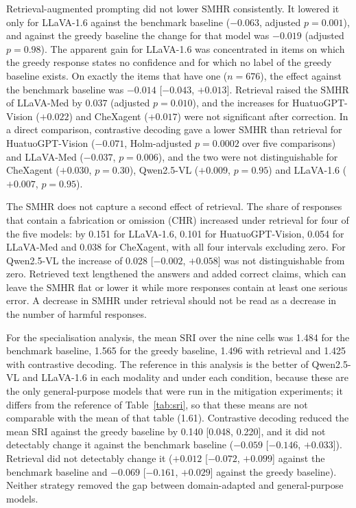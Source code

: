\documentclass[11pt,a4paper]{article}
\newcommand{\SMHR}{\ensuremath{\mathrm{SMHR}}}
\newcommand{\CHR}{\ensuremath{\mathrm{CHR}}}
\newcommand{\SRI}{\ensuremath{\mathrm{SRI}}}
\begin{document}
Retrieval-augmented prompting did not lower \SMHR{} consistently. It lowered it only for LLaVA-1.6 against the benchmark baseline ($-0.063$, adjusted $p=0.001$), and against the greedy baseline the change for that model was $-0.019$ (adjusted $p=0.98$). The apparent gain for LLaVA-1.6 was concentrated in items on which the greedy response states no confidence and for which no label of the greedy baseline exists. On exactly the items that have one ($n=676$), the effect against the benchmark baseline was $-0.014$ [$-0.043$, $+0.013$]. Retrieval raised the \SMHR{} of LLaVA-Med by $0.037$ (adjusted $p=0.010$), and the increases for HuatuoGPT-Vision ($+0.022$) and CheXagent ($+0.017$) were not significant after correction. In a direct comparison, contrastive decoding gave a lower \SMHR{} than retrieval for HuatuoGPT-Vision ($-0.071$, Holm-adjusted $p=0.0002$ over five comparisons) and LLaVA-Med ($-0.037$, $p=0.006$), and the two were not distinguishable for CheXagent ($+0.030$, $p=0.30$), Qwen2.5-VL ($+0.009$, $p=0.95$) and LLaVA-1.6 ($+0.007$, $p=0.95$).

The \SMHR{} does not capture a second effect of retrieval. The share of responses that contain a fabrication or omission (\CHR{}) increased under retrieval for four of the five models: by 0.151 for LLaVA-1.6, 0.101 for HuatuoGPT-Vision, 0.054 for LLaVA-Med and 0.038 for CheXagent, with all four intervals excluding zero. For Qwen2.5-VL the increase of 0.028 [$-0.002$, $+0.058$] was not distinguishable from zero. Retrieved text lengthened the answers and added correct claims, which can leave the \SMHR{} flat or lower it while more responses contain at least one serious error. A decrease in \SMHR{} under retrieval should not be read as a decrease in the number of harmful responses.

For the specialisation analysis, the mean \SRI{} over the nine cells was 1.484 for the benchmark baseline, 1.565 for the greedy baseline, 1.496 with retrieval and 1.425 with contrastive decoding. The reference in this analysis is the better of Qwen2.5-VL and LLaVA-1.6 in each modality and under each condition, because these are the only general-purpose models that were run in the mitigation experiments; it differs from the reference of Table~\ref{tab:sri}, so that these means are not comparable with the mean of that table (1.61). Contrastive decoding reduced the mean \SRI{} against the greedy baseline by 0.140 [0.048, 0.220], and it did not detectably change it against the benchmark baseline ($-0.059$ [$-0.146$, $+0.033$]). Retrieval did not detectably change it ($+0.012$ [$-0.072$, $+0.099$] against the benchmark baseline and $-0.069$ [$-0.161$, $+0.029$] against the greedy baseline). Neither strategy removed the gap between domain-adapted and general-purpose models.
\end{document}
